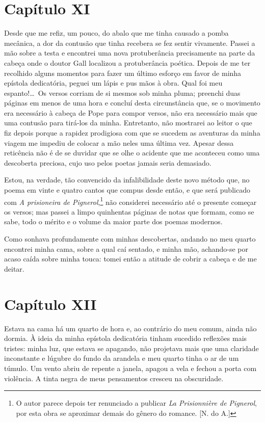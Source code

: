 \section{Capítulo XI}

  Desde que me refiz, um pouco, do abalo que me tinha causado a pomba
mecânica, a dor da contusão que tinha recebera se fez sentir vivamente.
Passei a mão sobre a testa e encontrei uma nova protuberância
precisamente na parte da cabeça onde o doutor Gall localizou a
protuberância poética. Depois de me ter recolhido alguns momentos para
fazer um último esforço em favor de minha epístola dedicatória, peguei
um lápis e pus mãos à obra. Qual foi meu espanto!\ldots\ Os versos corriam
de si mesmos sob minha pluma; preenchi duas páginas em menos de uma
hora e concluí desta circunstância que, se o movimento era necessário à
cabeça de Pope para compor versos, não era necessário mais que uma
contusão para tirá-los da minha. Entretanto, não mostrarei ao leitor o
que fiz depois porque a rapidez prodigiosa com que se sucedem as
aventuras da minha viagem me impediu de colocar a mão neles uma última
vez. Apesar dessa reticência não é de se duvidar que se olhe o acidente
que me aconteceu como uma descoberta preciosa, cujo uso pelos poetas
jamais seria demasiado.

 Estou, na verdade, tão convencido da infalibilidade deste novo método
que, no poema em vinte e quatro cantos que compus desde então, e que
será publicado com \textit{A prisioneira de Pignerol},\footnote{ O autor
parece depois ter renunciado a publicar \textit{La Prisionnière de
Pignerol}, por esta obra se aproximar demais do gênero do romance.
[N. do A.]} não considerei necessário até o presente começar os versos; mas
passei a limpo quinhentas páginas de notas que formam, como se sabe,
todo o mérito e o volume da maior parte dos poemas modernos.

 Como sonhava profundamente com minhas descobertas, andando no meu
quarto encontrei minha cama, sobre a qual caí sentado, e minha mão,
achando-se por acaso caída sobre minha touca: tomei então a atitude de
cobrir a cabeça e de me deitar.

\section{Capítulo XII}

 Estava na cama há um quarto de hora e, ao contrário do meu comum, ainda
não dormia. À ideia da minha epístola dedicatória tinham sucedido
reflexões mais tristes: minha luz, que estava se apagando, não
projetava mais que uma claridade inconstante e lúgubre do fundo da
arandela e meu quarto tinha o ar de um túmulo. Um vento abriu de
repente a janela, apagou a vela e fechou a porta com violência. A tinta
negra de meus pensamentos cresceu na obscuridade.

